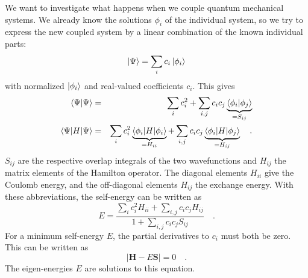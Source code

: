 We want to investigate what happens when we couple quantum mechanical systems. We already know the solutions $\phi_i$ of the individual system, so we try to express the new coupled system by a linear combination of the known individual parts:
\begin{equation}
 \ket{\Psi} = \sum_i  c_i \ket{\phi_i}  \label{eq:6_psi}
\end{equation}
with normalized $\ket{\phi_i}$ and real-valued coefficients $c_i$. This gives
\begin{eqnarray}
\braket{\Psi | \Psi} &= & \sum_i c_i^2 + \sum_{i,j} c_i c_j \underbrace{\braket{\phi_i| \phi_j}}_{= S_{ij}}\\
\braket{\Psi | H | \Psi} &=& \sum_i c_i^2 \underbrace{\braket{\phi_i | H | \phi_i }}_{= H_{ii}} 
                     + \sum_{i,j} c_i c_j \underbrace{\braket{\phi_i | H | \phi_j }}_{= H_{ij}}  \quad .
\end{eqnarray}
$S_{ij}$ are the respective overlap integrals of the two wavefunctions and $H_{ij}$ the matrix elements of the Hamilton operator.  The diagonal elements $H_{ii}$  give the Coulomb energy, and the off-diagonal elements $H_{ij}$  the exchange energy. With these abbreviations, the self-energy can be written as
\begin{equation}
  E = \frac{\sum_i c_i^2 H_{ii}  + \sum_{i,j} c_i c_j H_{ij}}{1 + \sum_{i,j} c_i c_j S_{ij}}
  \quad . \label{eq:6_e_variation}
\end{equation}
For a minimum self-energy $E$, the partial derivatives to $c_i$ must both be zero. This can be written as 
\begin{equation}
   \left|   \mathbf{H} - E \mathbf{S} \right| = 0  \quad .
\end{equation}
The eigen-energies $E$ are solutions to this equation.






